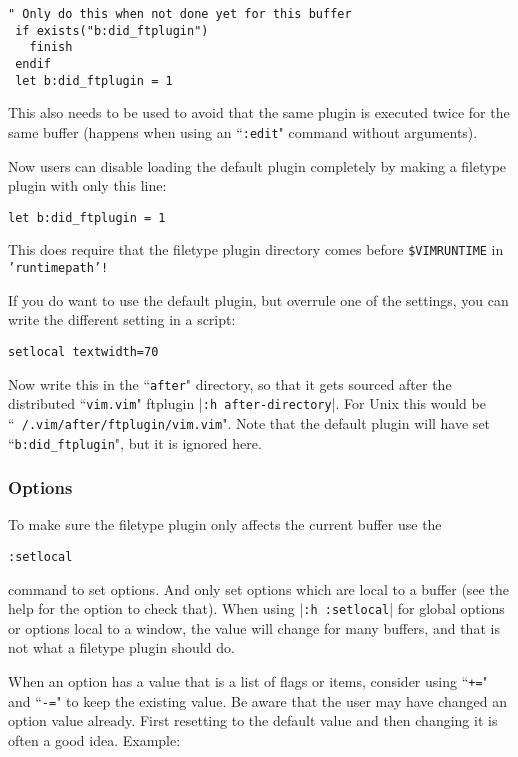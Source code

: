\begin{Verbatim}[samepage=true]
 " Only do this when not done yet for this buffer
 if exists("b:did_ftplugin")
   finish
 endif
 let b:did_ftplugin = 1
\end{Verbatim}

This also needs to be used to avoid that the same plugin is executed twice for the same buffer (happens when using an ``\texttt{:edit}" command without arguments).

Now users can disable loading the default plugin completely by making a filetype plugin with only this line:

\begin{Verbatim}[samepage=true]
 let b:did_ftplugin = 1
\end{Verbatim}

This does require that the filetype plugin directory comes before \texttt{\$VIMRUNTIME} in \texttt{'runtimepath'!}

If you do want to use the default plugin, but overrule one of the settings, you can write the different setting in a script:

\begin{Verbatim}[samepage=true]
 setlocal textwidth=70
\end{Verbatim}

Now write this in the ``\texttt{after}" directory, so that it gets sourced after the distributed ``\texttt{vim.vim}" ftplugin |\texttt{:h after-directory}|.
For Unix this would be ``\texttt{~/.vim/after/ftplugin/vim.vim}".
Note that the default plugin will have set ``\texttt{b:did\_ftplugin}", but it is ignored here.

\subsubsection{Options}
To make sure the filetype plugin only affects the current buffer use the

\begin{Verbatim}[samepage=true]
 :setlocal
\end{Verbatim}

command to set options.
And only set options which are local to a buffer (see the help for the option to check that).
When using |\texttt{:h :setlocal}| for global options or options local to a window, the value will change for many buffers, and that is not what a filetype plugin should do.

When an option has a value that is a list of flags or items, consider using ``\texttt{+=}" and ``\texttt{-=}" to keep the existing value.
Be aware that the user may have changed an option value already.
First resetting to the default value and then changing it is often a good idea.
Example:

